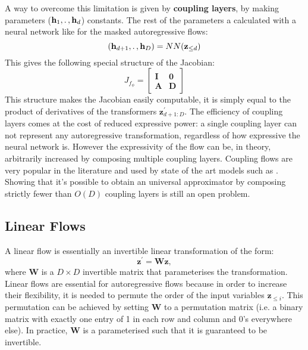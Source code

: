 \documentclass[english]{scrartcl}
\begin{document}
    A way to overcome this limitation is given by \textbf{coupling layers}, by making parameters ($\textbf{h}_1, \ldotp, \textbf{h}_d$) constants.
    The rest of the parameters a calculated with a neural network like for the masked autoregressive flows:
    \begin{equation}
    (\textbf{h}_{d+1}, \ldotp, \textbf{h}_D)
        = NN(\textbf{z}_{\leq d})
    \end{equation}
    This gives the following special structure of the Jacobian:
    \begin{equation}
        J_{f_{\phi}} = \begin{bmatrix}
                           \textbf{I} & \textbf{0}\\
                           \textbf{A} & \textbf{D}
        \end{bmatrix}
    \end{equation}
    This structure makes the Jacobian easily computable, it is simply equal to the product of derivatives of the
    transformers $\textbf{z}^{\prime}_{d+1:D}$.
    The efficiency of coupling layers comes at the cost of reduced expressive power: a single coupling layer can not represent
    any autoregressive transformation, regardless of how expressive the neural network is.
    However the expressivity of the flow can be, in theory, arbitrarily increased by composing multiple coupling layers.
    Coupling flows are very popular in the literature and used by state of the art models such as \citep[NICE, Glow, WaveGlow, Flow++][]{dinh_nice_2015,kingma_glow_2018, prenger_waveglow_2019, ho_flow_2019}.
    Showing that it's possible to obtain an universal approximator by composing strictly fewer than $O(D)$ coupling layers is still an open problem.

    \subsection{Linear Flows}
    A linear flow is essentially an invertible linear transformation of the form:
    \begin{equation}
        \textbf{z}^{\prime} = \textbf{W} \textbf{z},
    \end{equation}
    where $\textbf{W}$ is a $D \times D$ invertible matrix that parameterises the transformation.
    Linear flows are essential for autoregressive flows because in order to increase their flexibility, it is needed to permute the order of the input variables $\textbf{z}_{\leq i}$.
    This permutation can be achieved by setting $\textbf{W}$ to a permutation matrix (i.e. a binary matrix with exactly one entry of 1 in each row and column and 0's everywhere else).
    In practice, $\textbf{W}$ is a parameterised such that it is guaranteed to be invertible.
\end{document}
